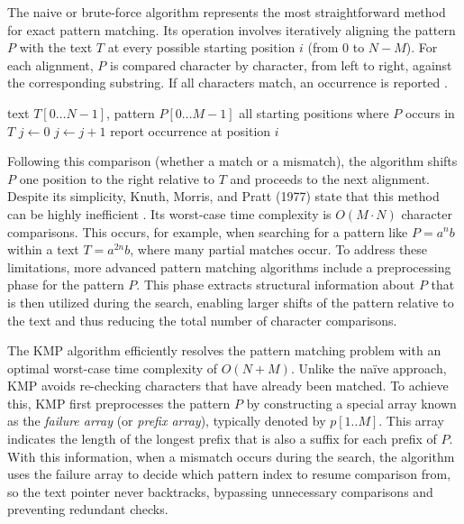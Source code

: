 \vspace{1em}


The naive or brute-force algorithm represents the most straightforward method for exact pattern matching. Its operation involves iteratively aligning the pattern $P$ with the text $T$ at every possible starting position $i$ (from 0 to $N-M$). For each alignment, $P$ is compared character by character, from left to right, against the corresponding substring. If all characters match, an occurrence is reported \cite{Gusfield1997}.

\begin{algorithm}[H]
\caption{Naive exact string matching}
\label{alg:naive-matching}
\begin{algorithmic}[1]
\Require text $T[0 \dots N-1]$, pattern $P[0 \dots M-1]$
\Ensure all starting positions where $P$ occurs in $T$
    \State $j \gets 0$
        \State $j \gets j + 1$
    \EndWhile
        \State report occurrence at position $i$
    \EndIf
\EndFor
\end{algorithmic}
\end{algorithm}

Following this comparison (whether a match or a mismatch), the algorithm shifts $P$ one position to the right relative to $T$ and proceeds to the next alignment. Despite its simplicity, Knuth, Morris, and Pratt (1977) state that this method can be highly inefficient \cite{KnuthMorrisPratt1977}. Its worst-case time complexity is $O(M \cdot N)$ character comparisons. This occurs, for example, when searching for a pattern like $P = a^n b$ within a text $T = a^{2n} b$, where many partial matches occur. To address these limitations, more advanced pattern matching algorithms include a preprocessing phase for the pattern $P$. This phase extracts structural information about $P$ that is then utilized during the search, enabling larger shifts of the pattern relative to the text and thus reducing the total number of character comparisons.

\vspace{1em}


The KMP algorithm \cite{KnuthMorrisPratt1977} efficiently resolves the pattern matching problem with an optimal worst-case time complexity of $O(N + M)$. Unlike the na\"ive approach, KMP avoids re-checking characters that have already been matched. To achieve this, KMP first preprocesses the pattern $P$ by constructing a special array known as the \textit{failure array} (or \textit{prefix array}), typically denoted by $p[1..M]$. This array indicates the length of the longest prefix that is also a suffix for each prefix of $P$. With this information, when a mismatch occurs during the search, the algorithm uses the failure array to decide which pattern index to resume comparison from, so the text pointer never backtracks, bypassing unnecessary comparisons and preventing redundant checks.

